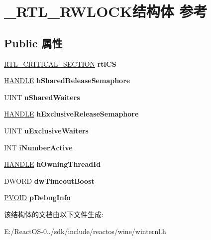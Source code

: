 \hypertarget{struct___r_t_l___r_w_l_o_c_k}{}\section{\+\_\+\+R\+T\+L\+\_\+\+R\+W\+L\+O\+C\+K结构体 参考}
\label{struct___r_t_l___r_w_l_o_c_k}
\subsection*{Public 属性}
\begin{DoxyCompactItemize}
\item 
\mbox{\label{struct___r_t_l___r_w_l_o_c_k_acb86abfa505329d4ffd8a34fe844098f}} 
\hyperlink{struct___r_t_l___c_r_i_t_i_c_a_l___s_e_c_t_i_o_n}{R\+T\+L\+\_\+\+C\+R\+I\+T\+I\+C\+A\+L\+\_\+\+S\+E\+C\+T\+I\+ON} {\bfseries rtl\+CS}
\item 
\mbox{\label{struct___r_t_l___r_w_l_o_c_k_a54f096586863c0ae28c199bcee01df22}} 
\hyperlink{interfacevoid}{H\+A\+N\+D\+LE} {\bfseries h\+Shared\+Release\+Semaphore}
\item 
\mbox{\label{struct___r_t_l___r_w_l_o_c_k_aee002fc407552ff3c41306aa8e0190c1}} 
U\+I\+NT {\bfseries u\+Shared\+Waiters}
\item 
\mbox{\label{struct___r_t_l___r_w_l_o_c_k_ad71b551eef1be9fa3225444055e8760a}} 
\hyperlink{interfacevoid}{H\+A\+N\+D\+LE} {\bfseries h\+Exclusive\+Release\+Semaphore}
\item 
\mbox{\label{struct___r_t_l___r_w_l_o_c_k_a380709f51f25f55c4f6b899f87b5e2aa}} 
U\+I\+NT {\bfseries u\+Exclusive\+Waiters}
\item 
\mbox{\label{struct___r_t_l___r_w_l_o_c_k_ad5ecd2c52f06e3e77d7edf032508eb59}} 
I\+NT {\bfseries i\+Number\+Active}
\item 
\mbox{\label{struct___r_t_l___r_w_l_o_c_k_a3e784fd87fe1ffed6e5ffa9912ae05c7}} 
\hyperlink{interfacevoid}{H\+A\+N\+D\+LE} {\bfseries h\+Owning\+Thread\+Id}
\item 
\mbox{\label{struct___r_t_l___r_w_l_o_c_k_a7c534c010a52b387dde42e0949be138c}} 
D\+W\+O\+RD {\bfseries dw\+Timeout\+Boost}
\item 
\mbox{\label{struct___r_t_l___r_w_l_o_c_k_a3214d8afca174f276e7e61142548b3f1}} 
\hyperlink{interfacevoid}{P\+V\+O\+ID} {\bfseries p\+Debug\+Info}
\end{DoxyCompactItemize}


该结构体的文档由以下文件生成\+:\begin{DoxyCompactItemize}
\item 
E\+:/\+React\+O\+S-\/0../sdk/include/reactos/wine/winternl.\+h\end{DoxyCompactItemize}
